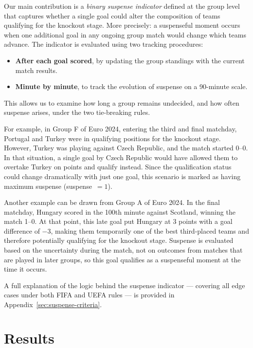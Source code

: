 \documentclass[11pt]{article}
\begin{document}
Our main contribution is a \textit{binary suspense indicator} defined at the group level that captures whether a single goal could alter the composition of teams qualifying for the knockout stage. More precisely: a suspenseful moment occurs when one additional goal in any ongoing group match would change which teams advance. The indicator is evaluated using two tracking procedures:

\begin{itemize}
    \item \textbf{After each goal scored}, by updating the group standings with the current match results.
    \item \textbf{Minute by minute}, to track the evolution of suspense on a 90-minute scale.
\end{itemize}

This allows us to examine how long a group remains undecided, and how often suspense arises, under the two tie-breaking rules.

For example, in Group F of Euro 2024, entering the third and final matchday, Portugal and Turkey were in qualifying positions for the knockout stage. However, Turkey was playing against Czech Republic, and the match started 0--0. In that situation, a single goal by Czech Republic would have allowed them to overtake Turkey on points and qualify instead. Since the qualification status could change dramatically with just one goal, this scenario is marked as having maximum suspense (suspense~$= 1$).

Another example can be drawn from Group A of Euro 2024. In the final matchday, Hungary scored in the 100th minute against Scotland, winning the match 1--0. At that point, this late goal put Hungary at 3 points with a goal difference of $-3$, making them temporarily one of the best third-placed teams and therefore potentially qualifying for the knockout stage. Suspense is evaluated based on the uncertainty during the match, not on outcomes from matches that are played in later groups, so this goal qualifies as a suspenseful moment at the time it occurs.

A full explanation of the logic behind the suspense indicator — covering all edge cases under both FIFA and UEFA rules — is provided in Appendix~\ref{sec:suspense-criteria}.


\section{Results}
\label{sec:results}
\end{document}

